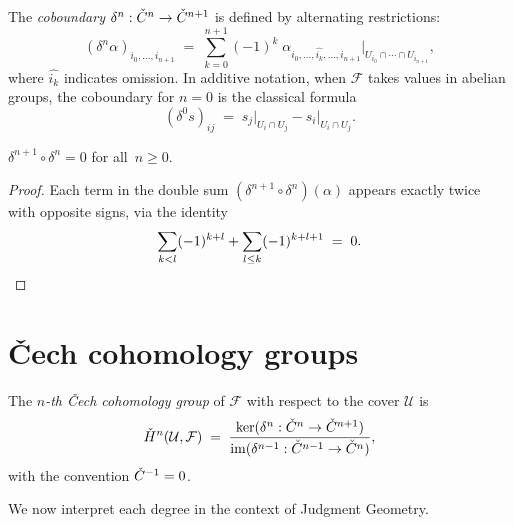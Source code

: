 \begin{definition}
\label{def:coboundary-p2}
The \emph{coboundary} $\delta^n : \check{C}^n \to \check{C}^{n+1}$ is defined
by alternating restrictions:
\[
  (\delta^n \alpha)_{i_0, \ldots, i_{n+1}}
  \;=\;
  \sum_{k=0}^{n+1} (-1)^k \;
  \alpha_{i_0, \ldots, \widehat{i_k}, \ldots, i_{n+1}}
  \Big|_{U_{i_0} \cap \cdots \cap U_{i_{n+1}}},
\]
where $\widehat{i_k}$ indicates omission. In additive notation, when
$\mathcal{F}$ takes values in abelian groups, the coboundary for $n=0$
is the classical formula
\[
  (\delta^0 s)_{ij} \;=\;
  s_j\big|_{U_i \cap U_j} - s_i\big|_{U_i \cap U_j}.
\]
\end{definition}

\begin{proposition}
\label{prop:d-squared}
$\delta^{n+1} \circ \delta^n = 0$ for all~$n \geq 0$.
\end{proposition}

\begin{proof}
Each term in the double sum
$(\delta^{n+1} \circ \delta^n)(\alpha)$ appears exactly twice with
opposite signs, via the identity
\[
  \sum_{k < l} (-1)^{k+l} + \sum_{l \leq k} (-1)^{k+l+1} \;=\; 0.
  \qedhere
\]
\end{proof}

\section{\v{C}ech cohomology groups}
\label{sec:cech-cohomology}

\begin{definition}
\label{def:cech-cohom}
The \emph{$n$-th \v{C}ech cohomology group} of $\mathcal{F}$ with
respect to the cover $\mathcal{U}$ is
\[
  \check{H}^n(\mathcal{U}, \mathcal{F})
  \;=\;
  \frac{\ker(\delta^n : \check{C}^n \to \check{C}^{n+1})}
       {\mathrm{im}(\delta^{n-1} : \check{C}^{n-1} \to \check{C}^n)},
\]
with the convention $\check{C}^{-1} = 0$.
\end{definition}

We now interpret each degree in the context of Judgment Geometry.

